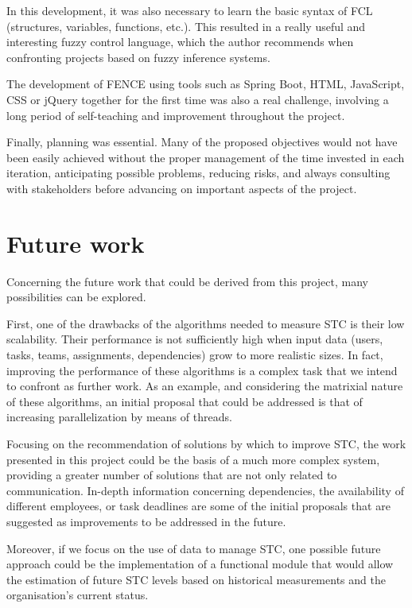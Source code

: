 In this development, it was also necessary to learn the basic syntax of FCL (structures, variables, functions, etc.). This resulted in a really useful and interesting fuzzy control language, which the author recommends when confronting projects based on fuzzy inference systems.

The development of FENCE using tools such as Spring Boot, HTML, JavaScript, CSS or jQuery together for the first time was also a real challenge, involving a long period of self-teaching and improvement throughout the project.

Finally, planning was essential. Many of the proposed objectives would not have been easily achieved without the proper management of the time invested in each iteration, anticipating possible problems, reducing risks, and always consulting with stakeholders before advancing on important aspects of the project.

\section{Future work}

Concerning the future work that could be derived from this project, many possibilities can be explored.

First, one of the drawbacks of the algorithms needed to measure STC is their low scalability. Their performance is not sufficiently high when input data (users, tasks, teams, assignments, dependencies) grow to more realistic sizes. In fact, improving the performance of these algorithms is a complex task that we intend to confront as further work. As an example, and considering the matrixial nature of these algorithms, an initial proposal that could be addressed is that of increasing parallelization by means of threads.

Focusing on the recommendation of solutions by which to improve STC, the work presented in this project could be the basis of a much more complex system, providing a greater number of solutions that are not only related to communication. In-depth information concerning dependencies, the availability of different employees, or task deadlines are some of the initial proposals that are suggested as improvements to be addressed in the future.

Moreover, if we focus on the use of data to manage STC, one possible future approach could be the implementation of a functional module that would allow the estimation of future STC levels based on historical measurements and the organisation’s current status.

